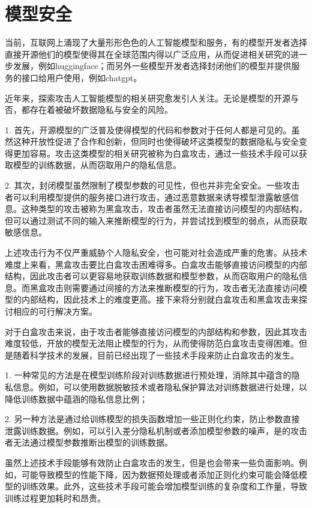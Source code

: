 \section{模型安全}

当前，互联网上涌现了大量形形色色的人工智能模型和服务，有的模型开发者选择直接开源他们的模型使得其在全球范围内得以广泛应用，从而促进相关研究的进一步发展，例如huggingface；而另外一些模型开发者选择封闭他们的模型并提供服务的接口给用户使用，例如chatgpt。

近年来，探索攻击人工智能模型的相关研究愈发引人关注。无论是模型的开源与否，都存在着被破坏数据隐私与安全的风险。

1. 首先，开源模型的广泛普及使得模型的代码和参数对于任何人都是可见的。虽然这种开放性促进了合作和创新，但同时也使得破坏这类模型的数据隐私与安全变得更加容易。攻击这类模型的相关研究被称为白盒攻击，通过一些技术手段可以获取模型的训练数据，从而窃取用户的隐私信息。

2. 其次，封闭模型虽然限制了模型参数的可见性，但也并非完全安全。一些攻击者可以利用模型提供的服务接口进行攻击，通过恶意数据来诱导模型泄露敏感信息。这种类型的攻击被称为黑盒攻击，攻击者虽然无法直接访问模型的内部结构，但可以通过测试不同的输入来推断模型的行为，并尝试找到模型的弱点，从而获取敏感信息。

上述攻击行为不仅严重威胁个人隐私安全，也可能对社会造成严重的危害。从技术难度上来看，黑盒攻击要比白盒攻击困难得多。白盒攻击能够直接访问模型的内部结构，因此攻击者可以更容易地获取训练数据和模型参数，从而窃取用户的隐私信息。而黑盒攻击则需要通过间接的方法来推断模型的行为，攻击者无法直接访问模型的内部结构，因此技术上的难度更高。接下来将分别就白盒攻击和黑盒攻击来探讨相应的可行解决方案。

对于白盒攻击来说，由于攻击者能够直接访问模型的内部结构和参数，因此其攻击难度较低，开放的模型无法阻止模型的行为，从而使得防范白盒攻击变得困难。但是随着科学技术的发展，目前已经出现了一些技术手段来防止白盒攻击的发生。

1. 一种常见的方法是在模型训练阶段对训练数据进行预处理，消除其中蕴含的隐私信息。例如，可以使用数据脱敏技术或者隐私保护算法对训练数据进行处理，以降低训练数据中蕴涵的隐私信息比例；

2. 另一种方法是通过给训练模型的损失函数增加一些正则化约束，防止参数直接泄露训练数据。例如，可以引入差分隐私机制或者添加模型参数的噪声，是的攻击者无法通过模型参数推断出模型的训练数据。

虽然上述技术手段能够有效防止白盒攻击的发生，但是也会带来一些负面影响。例如，可能导致模型的性能下降，因为数据预处理或者添加正则化约束可能会降低模型的训练效果。此外，这些技术手段可能会增加模型训练的复杂度和工作量，导致训练过程更加耗时和昂贵。

